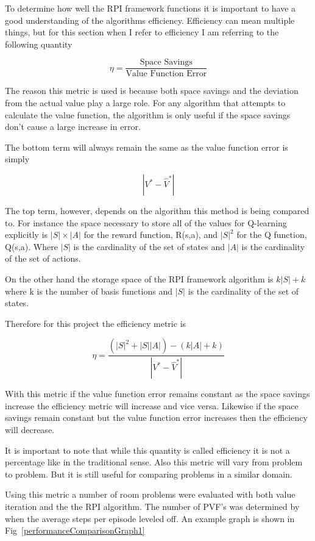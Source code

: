 \documentclass[12pt, letterpaper, final]{report}
\begin{document}
To determine how well the RPI framework functions it is important to
have a good understanding of the algorithms efficiency. Efficiency can
mean multiple things, but for this section when I refer to efficiency
I am referring to the following quantity

\[
\eta = \frac{\text{Space Savings}}{\text{Value Function Error}}
\]

The reason this metric is used is because both space savings and the
deviation from the actual value play a large role. For any algorithm
that attempts to calculate the value function, the algorithm is only
useful if the space savings don't cause a large increase in error. 

The bottom term will always remain the same as the value function
error is simply

\[
| V^{*} - \hat{V}^{*}|
\]

The top term, however, depends on the algorithm this method is being
compared to. For instance the space necessary to store all of the
values for Q-learning explicitly is $|S| \times |A|$ for the reward
function, R(s,a), and $|S|^2$ for the Q function, Q(s,a). Where $|S|$ is
the cardinality of the set of states and $|A|$ is the cardinality of
the set of actions.

On the other hand the storage space of the RPI framework algorithm is 
$k|S|+k$ where k is the number of basis functions and $|S|$ is the
cardinality of the set of states.

Therefore for this project the efficiency metric is

\[
\eta = \frac{(|S|^2 + |S||A|) - (k|A| + k)}{|V^{*} - \hat{V}^{*}|}
\]

With this metric if the value function error remains constant as the
space savings increase the efficiency metric will increase and vice
versa. Likewise if the space savings remain constant but the value
function error increases then the efficiency will decrease. 

It is
important to note that while this quantity is called efficiency it is
not a percentage like in the traditional sense. Also this metric will
vary from problem to problem. But it is still useful for comparing
problems in a similar domain.

Using this metric a number of room problems were evaluated with both
value iteration and the the RPI algorithm. The number of PVF's was
determined by when the average steps per episode leveled off. An
example graph is shown in Fig~\ref{performanceComparisonGraph1}
\end{document}
